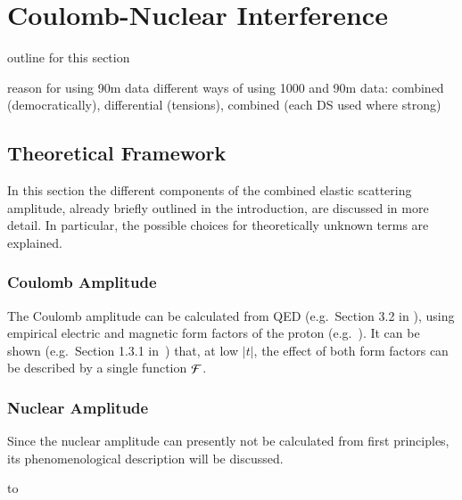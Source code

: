 \newpage

\section{Coulomb-Nuclear Interference}
\label{sec:coulomb}

\> outline for this section

\> reason for using 90m data
\> different ways of using 1000 and 90m data: combined (democratically), differential (tensions), combined (each DS used where strong)


\subsection{Theoretical Framework}
\label{sec:cni framework}

In this section the different components of the combined elastic scattering amplitude, already briefly outlined in the introduction, are discussed in more detail. In particular, the possible choices for theoretically unknown terms are explained.

\subsubsection{Coulomb Amplitude}
\label{sec:cni coulomb}
%
The Coulomb amplitude can be calculated from QED (e.g.~Section 3.2 in \cite{block06}), using empirical electric and magnetic form factors of the proton (e.g.~\cite{puckett10}). It can be shown (e.g.~Section 1.3.1 in~\cite{jan_thesis}) that, at low $|t|$, the effect of both form factors can be described by a single function ${\cal F}$. 



\subsubsection{Nuclear Amplitude}
\label{sec:cni nuclear}
%
Since the nuclear amplitude can presently not be calculated from first principles, its phenomenological description will be discussed.

\vskip3mm
\hbox to

